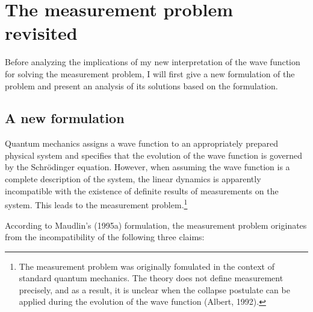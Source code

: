 
\section{The measurement problem revisited}


Before analyzing the implications of my new interpretation of the wave function for solving the measurement problem, I will first give a new formulation of the problem and present an analysis of its solutions based on the formulation.

\subsection{A new formulation}
Quantum mechanics assigns a wave function to an appropriately prepared physical system and specifies that the evolution of the wave function is governed by the Schr\"{o}dinger equation. However, when assuming the wave function is a complete description of the system, the linear dynamics is apparently incompatible with the existence of definite results of measurements on the system. This leads to the measurement problem.\footnote{The measurement problem was originally fomulated in the context of standard quantum mechanics. The theory does not define measurement precisely, and as a result, it is unclear when the collapse postulate can be applied during the evolution of the wave function (Albert, 1992).} %

According to Maudlin's (1995a) formulation, the measurement problem originates from the incompatibility of the following three claims:

